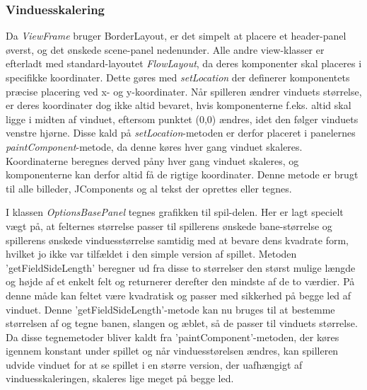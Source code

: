 \subsubsection{Vinduesskalering}
Da \textit{ViewFrame} bruger BorderLayout, er det simpelt at placere et header-panel øverst, og det ønskede scene-panel nedenunder. Alle andre view-klasser er efterladt med standard-layoutet \textit{FlowLayout}, da deres komponenter skal placeres i specifikke koordinater. Dette gøres med \textit{setLocation} der definerer komponentets præcise placering ved x- og y-koordinater. Når spilleren ændrer vinduets størrelse, er deres koordinater dog ikke altid bevaret, hvis komponenterne f.eks. altid skal ligge i midten af vinduet, eftersom punktet (0,0) ændres, idet den følger vinduets venstre hjørne. Disse kald på \textit{setLocation}-metoden er derfor placeret i panelernes \textit{paintComponent}-metode, da denne køres hver gang vinduet skaleres. Koordinaterne beregnes derved påny hver gang vinduet skaleres, og komponenterne kan derfor altid få de rigtige koordinater. Denne metode er brugt til alle billeder, JComponents og al tekst der oprettes eller tegnes.
\newline

I klassen \textit{OptionsBasePanel} tegnes grafikken til spil-delen. Her er lagt specielt vægt på, at felternes størrelse passer til spillerens ønskede bane-størrelse og spillerens ønskede vinduesstørrelse samtidig med at bevare dens kvadrate form, hvilket jo ikke var tilfældet i den simple version af spillet. Metoden 'getFieldSideLength' beregner ud fra disse to størrelser den størst mulige længde og højde af et enkelt felt og returnerer derefter den mindste af de to værdier. På denne måde kan feltet være kvadratisk og passer med sikkerhed på begge led af vinduet. Denne 'getFieldSideLength'-metode kan nu bruges til at bestemme størrelsen af og tegne banen, slangen og æblet, så de passer til vinduets størrelse. Da disse tegnemetoder bliver kaldt fra 'paintComponent'-metoden, der køres igennem konstant under spillet og når vinduesstørelsen ændres, kan spilleren udvide vinduet for at se spillet i en større version, der uafhængigt af vinduesskaleringen, skaleres lige meget på begge led.

